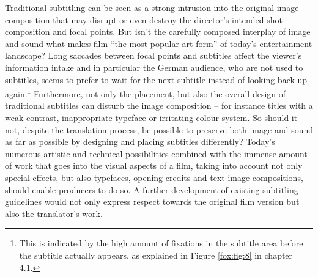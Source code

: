 \documentclass[output=paper]{langsci/langscibook}
\begin{document}
Traditional subtitling can be seen as a strong intrusion into the original image composition that may disrupt or even destroy the director’s intended shot composition and focal points. But isn’t the carefully composed interplay of image and sound what makes film “the most popular art form” \citep[35]{mercado2010} of today’s entertainment landscape? Long saccades between focal points and subtitles affect the viewer’s information intake and in particular the German audience, who are not used to subtitles, seems to prefer to wait for the next subtitle instead of looking back up again.\footnote{This is indicated by the high amount of fixations in the subtitle area before the subtitle actually appears, as explained in Figure \ref{fox:fig:8} in chapter 4.1.} Furthermore, not only the placement, but also the overall design of traditional subtitles can disturb the image composition – for instance titles with a weak contrast, inappropriate typeface or irritating colour system. So should it not, despite the translation process, be possible to preserve both image and sound as far as possible by designing and placing subtitles differently? Today’s numerous artistic and technical possibilities combined with the immense amount of work that goes into the visual aspects of a film, taking into account not only special effects, but also typefaces, opening credits and text-image compositions, should enable producers to do so. A further development of existing subtitling guidelines would not only express respect towards the original film version but also the translator’s work.
\end{document}
